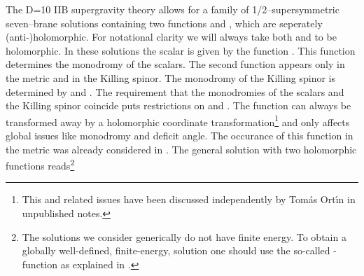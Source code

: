 \documentclass[12pt,a4paper]{article}
\begin{document}
The D=10 IIB supergravity theory allows for a family of
1/2--supersymmetric seven--brane solutions containing two
functions \coordHE{} and \coordHE{}, which are seperately (anti-)holomorphic.
For notational clarity we will always take both \coordHE{} and \coordHE{} to be
holomorphic. In these solutions the scalar \myHighlight{$\hat{\tau}$}\coordHE{} is given
by the function \coordHE{} \cite{Greene:1990ya,Gibbons:1996vg}. This
function determines the monodromy of the scalars. The second
function \coordHE{} appears only in the metric and in the Killing spinor.
The monodromy of the Killing spinor is determined by \coordHE{} and \coordHE{}.
The requirement that the monodromies of the scalars and the
Killing spinor coincide puts restrictions on \coordHE{} and \coordHE{}. The
function \coordHE{} can always be transformed away by a holomorphic
coordinate transformation\footnote{This and related issues have
been discussed independently by Tom\'as Ort\'\i n in unpublished
notes.} and only affects global issues like monodromy and deficit
angle. The occurance of this function in the metric was already
considered in \cite{Greene:1990ya, Meessen:1998qm}. The general
solution with two holomorphic functions reads\footnote{The solutions 
we consider generically do not have finite energy. 
To obtain a globally well-defined, finite-energy,
solution one should use the so-called \coordHE{}-function as explained in
\cite{Greene:1990ya}.}
\end{document}
